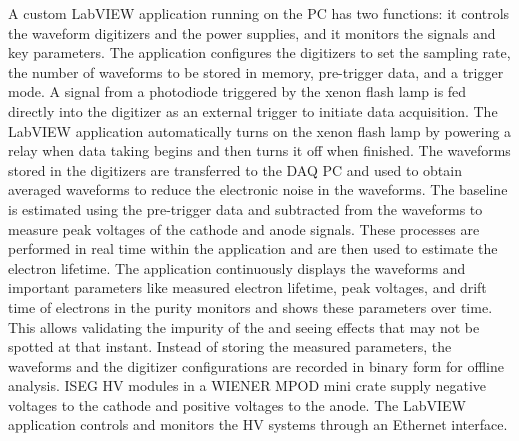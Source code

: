 A custom LabVIEW application running on the  PC has two functions: it controls the waveform digitizers and the power supplies, and it monitors the signals and key parameters. The application configures the digitizers to set the sampling rate, the number of waveforms to be stored in memory, pre-trigger data, and a trigger mode. A signal from a photodiode triggered by the xenon flash lamp is fed directly into the digitizer as an external trigger to initiate data acquisition. The LabVIEW application automatically turns on the xenon flash lamp by powering a relay when data taking begins and then turns it off when finished.
The waveforms stored in the digitizers are transferred to the DAQ PC and used to obtain averaged waveforms to reduce the electronic noise in the waveforms. The baseline is estimated using the pre-trigger data and subtracted from the waveforms  to measure peak voltages of the cathode and anode signals. These processes are performed in real time within the application and are then used to estimate the electron lifetime.
The application continuously displays the waveforms and important parameters like measured electron lifetime, peak voltages, and drift time of electrons in the purity monitors and shows these parameters over time.
This allows validating the impurity of the  and seeing effects that may not be spotted at that instant. Instead of storing the measured parameters, the waveforms and the digitizer configurations are recorded in binary form for offline analysis. ISEG HV modules in a WIENER MPOD mini crate supply negative voltages to the cathode and positive voltages to the anode. The LabVIEW application controls and monitors the HV systems through an Ethernet interface.  

